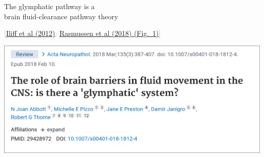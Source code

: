 \documentclass[mathserif, aspectratio=169]{beamer}
\newcommand{\refer}[1]{\begin{flushright}{\tiny \textcolor{darkgray}{[#1]}}\end{flushright}}
\begin{document}
{
\begin{frame}
  \vspace{1em}
  The glymphatic pathway is a \\ brain fluid-clearance pathway theory
  \vspace{18em}
  \refer{\href{https://stm.sciencemag.org/content/4/147/147ra111.full}{Iliff et al (2012)}; \href{https://doi.org/10.1016/S1474-4422(18)30318-1}{Rasmussen et al (2018) (Fig.~1)}}
\end{frame}
}

\begin{frame}
  \begin{center}
    \includegraphics[width=\textwidth]{graphics/abbott_2018.png}
  \end{center}
\end{frame}


%



\end{document}
